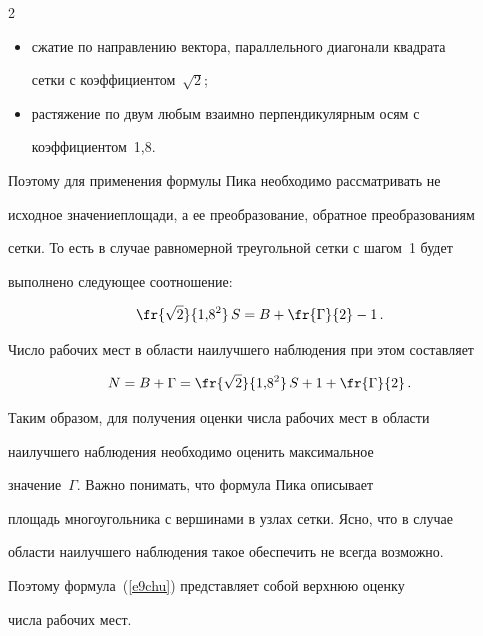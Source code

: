 \begin{multicols}{2}
\begin{itemize}
\item сжатие по направлению вектора, параллельного диагонали квадрата 


сетки с коэффициентом~$\sqrt{2}$;


\item растяжение по двум любым взаимно перпендикулярным осям с 


коэффициентом~1,8.


\end{itemize}





Поэтому для применения формулы Пика необходимо рассматривать не 


исходное значение\linebreak площади, а ее преобразование, обратное преобразованиям 


сетки. То есть в случае равномерной треугольной сетки с шагом~1 будет 


выполнено следующее соотношение:


\begin{equation}


\fr{\sqrt{2}}{1{,}8^2}\,S=B+\fr{\Gamma}{2}-1\,.


\label{e8chu}


\end{equation}


Число рабочих мест в области наилучшего наблюдения при этом составляет


\begin{equation}


N=B+\Gamma=\fr{\sqrt{2}}{1{,}8^2}\,S+1+\fr{\Gamma}{2}\,.


\label{e9chu}


\end{equation}


Таким образом, для получения оценки числа рабочих мест в области 


наилучшего наблюдения необходимо оценить максимальное 


значение~$\Gamma$. Важно понимать, что формула Пика описывает 


площадь многоугольника с вершинами в узлах сетки. Ясно, что в случае 


области наилучшего наблюдения такое обеспечить не всегда возможно. 


Поэтому формула~(\ref{e9chu}) представляет собой верхнюю оценку  


числа рабочих мест.






\end{multicols}
